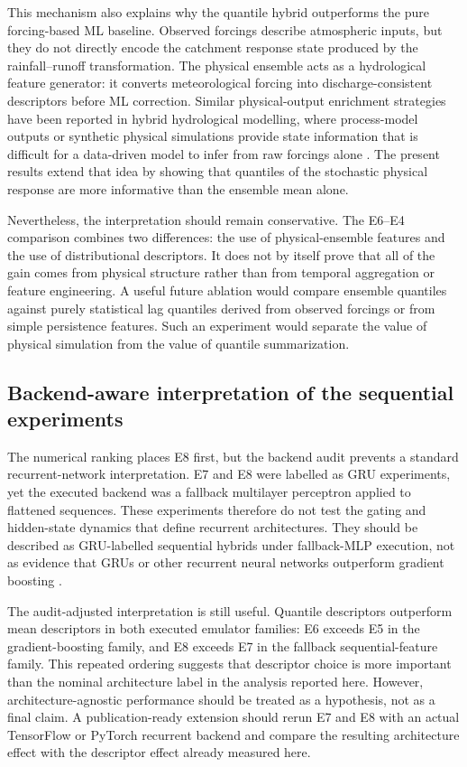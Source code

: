 \documentclass[a4paper,fleqn]{cas-sc}
\begin{document}
This mechanism also explains why the quantile hybrid outperforms the
pure forcing-based ML baseline. Observed forcings describe atmospheric
inputs, but they do not directly encode the catchment response state
produced by the rainfall--runoff transformation. The physical ensemble
acts as a hydrological feature generator: it converts meteorological
forcing into discharge-consistent descriptors before ML correction.
Similar physical-output enrichment strategies have been reported in
hybrid hydrological modelling, where process-model outputs or synthetic
physical simulations provide state information that is difficult for a
data-driven model to infer from raw forcings alone
\citep{mekonnen2015hybrid,yang2020physical,xie2021physics,li2024process,zhu2025hybrid}. The present results extend that idea by showing that
quantiles of the stochastic physical response are more informative than
the ensemble mean alone.

Nevertheless, the interpretation should remain conservative. The
E6--E4 comparison combines two differences: the use of physical-ensemble
features and the use of distributional descriptors. It does not by
itself prove that all of the gain comes from physical structure rather
than from temporal aggregation or feature engineering. A useful future
ablation would compare ensemble quantiles against purely statistical lag
quantiles derived from observed forcings or from simple persistence
features. Such an experiment would separate the value of physical
simulation from the value of quantile summarization.

\subsection{Backend-aware interpretation of the sequential experiments}
\label{subsec:discussion-backend}

The numerical ranking places E8 first, but the backend audit prevents a
standard recurrent-network interpretation. E7 and E8 were labelled as
GRU experiments, yet the executed backend was a fallback multilayer
perceptron applied to flattened sequences. These experiments therefore
do not test the gating and hidden-state dynamics that define recurrent
architectures. They should be described as GRU-labelled sequential
hybrids under fallback-MLP execution, not as evidence that GRUs or other
recurrent neural networks outperform gradient boosting
\citep{kratzert2018rainfall,kratzert2019towards}.

The audit-adjusted interpretation is still useful. Quantile descriptors
outperform mean descriptors in both executed emulator families: E6
exceeds E5 in the gradient-boosting family, and E8 exceeds E7 in the
fallback sequential-feature family. This repeated ordering suggests
that descriptor choice is more important than the nominal architecture
label in the analysis reported here. However, architecture-agnostic
performance should be treated as a hypothesis, not as a final claim. A
publication-ready extension should rerun E7 and E8 with an actual
TensorFlow or PyTorch recurrent backend and compare the resulting
architecture effect with the descriptor effect already measured here.
\end{document}
